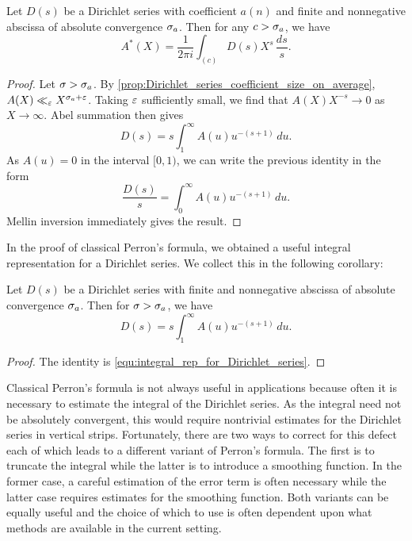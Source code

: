     \begin{theorem*}
      Let \(D(s)\) be a Dirichlet series with coefficient \(a(n)\) and finite and nonnegative abscissa of absolute convergence \(\sigma_{a}\). Then for any \(c > \sigma_{a}\), we have
      \[
        A^{\ast}(X) = \frac{1}{2\pi i}\int_{(c)}D(s)X^{s}\,\frac{ds}{s}.
      \]
    \end{theorem*}
    \begin{proof}
      Let \(\sigma > \sigma_{a}\). By \cref{prop:Dirichlet_series_coefficient_size_on_average}, \(A(X) \ll_{\varepsilon} X^{\sigma_{a}+\varepsilon}\). Taking \(\varepsilon\) sufficiently small, we find that \(A(X)X^{-s} \to 0\) as \(X \to \infty\). Abel summation then gives
      \begin{equation}\label{equ:integral_rep_for_Dirichlet_series}
        D(s) = s\int_{1}^{\infty}A(u)u^{-(s+1)}\,du.
      \end{equation}
      As \(A(u) = 0\) in the interval \([0,1)\), we can write the previous identity in the form
      \[
        \frac{D(s)}{s} = \int_{0}^{\infty}A(u)u^{-(s+1)}\,du.
      \]
      Mellin inversion immediately gives the result.
    \end{proof}

    In the proof of classical Perron's formula, we obtained a useful integral representation for a Dirichlet series. We collect this in the following corollary:

    \begin{corollary}\label{cor:integral_rep_for_Dirichlet_series}
      Let \(D(s)\) be a Dirichlet series with finite and nonnegative abscissa of absolute convergence \(\sigma_{a}\). Then for \(\sigma > \sigma_{a}\), we have
      \[
        D(s) = s\int_{1}^{\infty}A(u)u^{-(s+1)}\,du.
      \]
    \end{corollary}
    \begin{proof}
      The identity is \cref{equ:integral_rep_for_Dirichlet_series}.
    \end{proof}

    Classical Perron's formula is not always useful in applications because often it is necessary to estimate the integral of the Dirichlet series. As the integral need not be absolutely convergent, this would require nontrivial estimates for the Dirichlet series in vertical strips. Fortunately, there are two ways to correct for this defect each of which leads to a different variant of Perron's formula. The first is to truncate the integral while the latter is to introduce a smoothing function. In the former case, a careful estimation of the error term is often necessary while the latter case requires estimates for the smoothing function. Both variants can be equally useful and the choice of which to use is often dependent upon what methods are available in the current setting.
    
